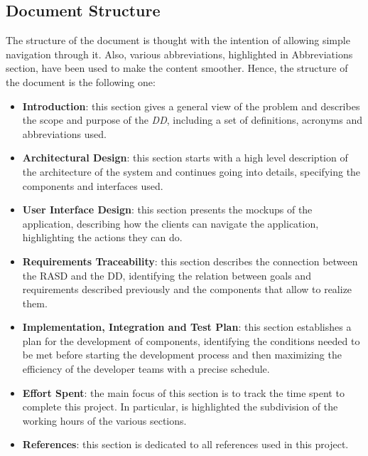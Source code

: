 \documentclass{article}
\begin{document}
	\subsection{Document Structure}
		The structure of the document is thought with the intention of allowing simple navigation through it. Also, various abbreviations, highlighted in Abbreviations section, have been used to make the content smoother.
		Hence, the structure of the document is the following one:
		\begin{itemize}
			\item {\bfseries Introduction}: this section gives a general view of the problem and describes the scope and purpose of the \emph{DD}, including a set of definitions, acronyms and abbreviations used.
			
			\item {\bfseries Architectural Design}: this section starts with a high level description of the architecture of the system and continues going into details, specifying the components and interfaces used.
			
			\item {\bfseries User Interface Design}: this section presents the mockups of the application, describing how the clients can navigate the application, highlighting the actions they can do.
			
			\item {\bfseries Requirements Traceability}: this section describes the connection between the RASD and the DD, identifying the relation between goals and requirements described previously and the components that allow to realize them.
			
			\item {\bfseries Implementation, Integration and Test Plan}: this section establishes a plan for the development of components, identifying the conditions needed to be met before starting the development process and then maximizing the efficiency of the developer teams with a precise schedule.
			
			\item {\bfseries Effort Spent}: the main focus of this section is to track the time spent to complete this project. In particular, is highlighted the subdivision of the working hours of the various sections.
			
			\item {\bfseries References}: this section is dedicated to all references used in this project.
		\end{itemize}
\end{document}
